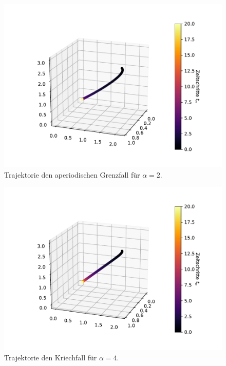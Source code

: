 \begin{figure}[H]
  \centering
  \includegraphics[scale=0.7]{A2/build/Plots/aufg1_a2.pdf}
  \caption{Trajektorie den aperiodischen Grenzfall für $\alpha = 2$.}
  \label{fig:Aperiodisch}
\end{figure}

\begin{figure}[H]
  \centering
  \includegraphics[scale=0.7]{A2/build/Plots/aufg1_a3.pdf}
  \caption{Trajektorie den Kriechfall für $\alpha = 4$.}
  \label{fig:Kriech}
\end{figure}

